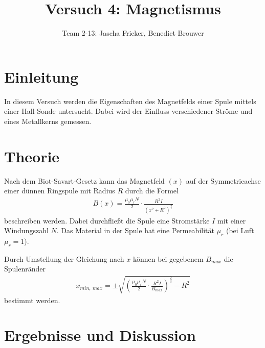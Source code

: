 \documentclass[11pt, a4paper]{article}
\title{Versuch 4: Magnetismus}
\author{Team 2-13: Jascha Fricker, Benedict Brouwer}
\begin{document}
    \maketitle

    \tableofcontents

    \newpage

    \section{Einleitung}

    In diesem Versuch werden die Eigenschaften des Magnetfelds einer Spule mittels einer Hall-Sonde untersucht. Dabei wird der Einfluss verschiedener Ströme und eines Metallkerns gemessen.

    \section{Theorie}

    Nach dem Biot-Savart-Gesetz kann das Magnetfeld $(x)$ auf der Symmetrieachse einer dünnen Ringspule mit Radius $R$ durch die Formel
    \begin{align}
        B(x) = \frac{\mu_0 \mu_r N}{2} \cdot \frac{R^2 I}{\left(x^2 + R^2\right)^{\frac{3}{2}}} \label{eq:BiotSavart}
    \end{align}
    beschreiben werden. Dabei durchfließt die Spule eine Stromstärke $I$ mit einer Windungszahl $N$. Das Material in der Spule hat eine Permeabilität $\mu_r$ (bei Luft $\mu_r = 1$).
    
    Durch Umstellung der Gleichung nach $x$ können bei gegebenem $B_{max}$ die Spulenränder
    \begin{align}
        x_{min, \ max} = \pm \sqrt{\left(\frac{\mu_0 \mu_r N}{2} \cdot \frac{R^2 I}{B_{max}}\right)^\frac{2}{3} - R^2} \label{eq:bmax}
    \end{align}
    bestimmt werden. 

    \section{Ergebnisse und Diskussion}
\end{document}

